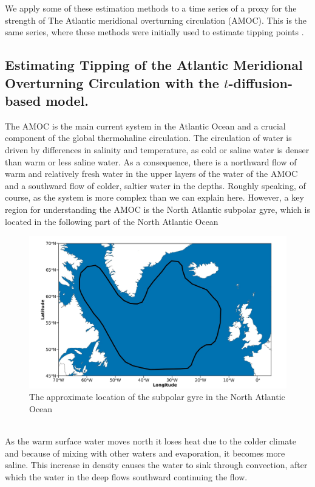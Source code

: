 We apply some of these estimation methods to a time series of a proxy for the strength of The Atlantic meridional overturning circulation (AMOC). This is the same series,  where these methods were initially used to estimate tipping points \cite{Ditlevsen2023}.
\subsection{Estimating Tipping of the Atlantic Meridional Overturning Circulation with the \texorpdfstring{$t$}{t}-diffusion-based model.}
The AMOC is the main current system in the Atlantic Ocean and a crucial component of the global thermohaline circulation. The circulation of water is driven by differences in salinity and temperature, as cold or saline water is denser than warm or less saline water. As a consequence, there is a northward flow of warm and relatively fresh water in the upper layers of the water of the AMOC and a southward flow of colder, saltier water in the depths. Roughly speaking, of course, as the system is more complex than we can explain here. However, a key region for understanding the AMOC is the North Atlantic subpolar gyre, which is located in the following part of the North Atlantic Ocean
\begin{figure}[h!]
    \begin{center}
        \includegraphics[scale = .175]{figures/NorthAtlanticOcean.jpeg}
    \end{center}
    \caption{The approximate location of the subpolar gyre in the North Atlantic Ocean}
    \label{figure:subpolarGyre}
\end{figure}\\
As the warm surface water moves north it loses heat due to the colder climate and because of mixing with other waters and evaporation, it becomes more saline. This increase in density causes the water to sink through convection, after which the water in the deep flows southward continuing the flow. 

